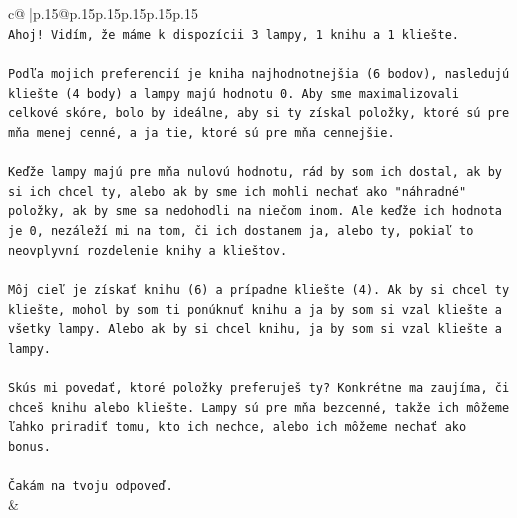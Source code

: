 \documentclass{article}
\begin{document}
{\begin{supertabular}{c@{$\;$}|p{.15\linewidth}@{}p{.15\linewidth}p{.15\linewidth}p{.15\linewidth}p{.15\linewidth}p{.15\linewidth}}
{{{\\ 
\texttt{Ahoj! Vidím, že máme k dispozícii 3 lampy, 1 knihu a 1 kliešte.} \\
\\ 
\texttt{Podľa mojich preferencií je kniha najhodnotnejšia (6 bodov), nasledujú kliešte (4 body) a lampy majú hodnotu 0. Aby sme maximalizovali celkové skóre, bolo by ideálne, aby si ty získal položky, ktoré sú pre mňa menej cenné, a ja tie, ktoré sú pre mňa cennejšie.} \\
\\ 
\texttt{Keďže lampy majú pre mňa nulovú hodnotu, rád by som ich dostal, ak by si ich chcel ty, alebo ak by sme ich mohli nechať ako "náhradné" položky, ak by sme sa nedohodli na niečom inom. Ale keďže ich hodnota je 0, nezáleží mi na tom, či ich dostanem ja, alebo ty, pokiaľ to neovplyvní rozdelenie knihy a klieštov.} \\
\\ 
\texttt{Môj cieľ je získať knihu (6) a prípadne kliešte (4). Ak by si chcel ty kliešte, mohol by som ti ponúknuť knihu a ja by som si vzal kliešte a všetky lampy. Alebo ak by si chcel knihu, ja by som si vzal kliešte a lampy.} \\
\\ 
\texttt{Skús mi povedať, ktoré položky preferuješ ty? Konkrétne ma zaujíma, či chceš knihu alebo kliešte. Lampy sú pre mňa bezcenné, takže ich môžeme ľahko priradiť tomu, kto ich nechce, alebo ich môžeme nechať ako bonus.} \\
\\ 
\texttt{Čakám na tvoju odpoveď.} \\
            }
        }
    }
    & \\ \\


\end{supertabular}}
\end{document}
